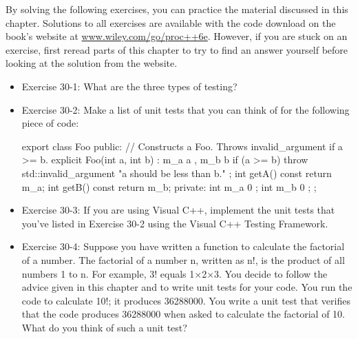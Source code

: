 By solving the following exercises, you can practice the material discussed in this chapter. Solutions to all exercises are available with the code download on the book’s website at \url{www.wiley.com/go/proc++6e}. However, if you are stuck on an exercise, first reread parts of this chapter to try to find an answer yourself before looking at the solution from the website.

\begin{itemize}
\item
Exercise 30-1: What are the three types of testing?

\item
Exercise 30-2: Make a list of unit tests that you can think of for the following piece of code:

\begin{cpp}
export class Foo
{
    public:
        // Constructs a Foo. Throws invalid_argument if a >= b.
        explicit Foo(int a, int b) : m_a { a }, m_b { b }
        {
            if (a >= b) {
                throw std::invalid_argument { "a should be less than b." };
            }
        }
        int getA() const { return m_a; }
        int getB() const { return m_b; }
    private:
        int m_a { 0 };
        int m_b { 0 };
};
\end{cpp}

\item
Exercise 30-3: If you are using Visual C++, implement the unit tests that you’ve listed in Exercise 30-2 using the Visual C++ Testing Framework.

\item
Exercise 30-4: Suppose you have written a function to calculate the factorial of a number.
The factorial of a number n, written as n!, is the product of all numbers 1 to n. For example, 3! equals 1×2×3. You decide to follow the advice given in this chapter and to write unit tests for your code. You run the code to calculate 10!; it produces 36288000. You write a unit test that verifies that the code produces 36288000 when asked to calculate the factorial of 10. What do you think of such a unit test?
\end{itemize}
